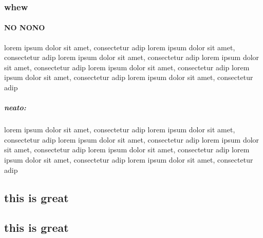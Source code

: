 \subsubsection{whew}
\paragraph{NO NONO}
lorem ipsum dolor sit amet, consectetur adip
lorem ipsum dolor sit amet, consectetur adip
lorem ipsum dolor sit amet, consectetur adip
lorem ipsum dolor sit amet, consectetur adip
lorem ipsum dolor sit amet, consectetur adip
lorem ipsum dolor sit amet, consectetur adip
lorem ipsum dolor sit amet, consectetur adip
\subparagraph{neato:}
lorem ipsum dolor sit amet, consectetur adip
lorem ipsum dolor sit amet, consectetur adip
lorem ipsum dolor sit amet, consectetur adip
lorem ipsum dolor sit amet, consectetur adip
lorem ipsum dolor sit amet, consectetur adip
lorem ipsum dolor sit amet, consectetur adip
lorem ipsum dolor sit amet, consectetur adip
\subsection{this is great}
\subsection{this is great}
